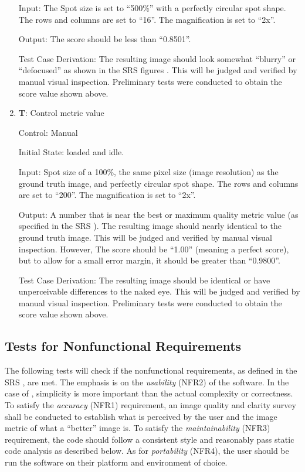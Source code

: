 \documentclass[12pt, titlepage]{article}
\newcounter{testnum} %
\begin{document}
\begin{enumerate}
  Input: The Spot size is set to ``500\%'' with a perfectly circular spot shape.
    The rows and columns are set to ``16''.
    The magnification is set to ``2x''.
            
  Output: The score should be less than ``0.8501''.

  Test Case Derivation: The resulting image should look somewhat ``blurry'' or ``defocused''
    as shown in the SRS figures \citep{SRS}.
    This will be judged and verified by manual visual inspection.
    Preliminary tests were conducted to obtain the score value shown above.

  \item{\textbf{T\thetestnum \label{T_manualMetricControl}}: Control metric value\\}

  Control: Manual
              
  Initial State: \progname{} loaded and idle.
            
  Input: Spot size of a 100\%, the same pixel size (image resolution) as the ground truth image, 
    and perfectly circular spot shape.
    The rows and columns are set to ``200''.
    The magnification is set to ``2x''.
            
  Output: A number that is near the best or maximum quality metric value
    (as specified in the SRS \cite{SRS}). The resulting image should nearly
    identical to the ground truth image. This will be judged and verified by manual visual inspection.
    However, The score should be ``1.00'' (meaning a perfect score), but to allow
    for a small error margin, it should be greater than ``0.9800''.

  Test Case Derivation: The resulting image should be identical or have unperceivable differences to the naked eye.
    This will be judged and verified by manual visual inspection.
    Preliminary tests were conducted to obtain the score value shown above.

\end{enumerate}


\subsection{Tests for Nonfunctional Requirements} \label{sec_NFR_tests}

The following tests will check if the nonfunctional requirements, as defined in the SRS \citep{SRS}, are 
met. The emphasis is on the \textit{usability} (NFR2) of the software. In the case of \progname{}, 
simplicity is more important than the actual complexity or correctness.
To satisfy the \textit{accuracy} (NFR1) requirement, an image quality and clarity survey shall be
conducted to establish what is perceived by the user and the image metric of what 
a ``better'' image is. To satisfy the \textit{maintainability} (NFR3) requirement, the code should 
follow a consistent style and reasonably pass static code analysis as described below.
As for \textit{portability} (NFR4), the user should be run the software on their platform and 
environment of choice.
\end{document}
